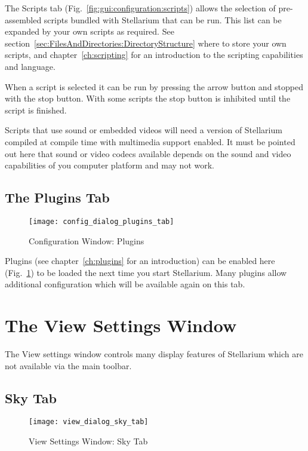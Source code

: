 The Scripts tab (Fig.~\ref{fig:gui:configuration:scripts}) allows the selection of
pre-assembled scripts bundled with Stellarium that can be run. This
list can be expanded by your own scripts as required. See
section~\ref{sec:FilesAndDirectories:DirectoryStructure} where to
store your own scripts, and chapter~\ref{ch:scripting} for an
introduction to the scripting capabilities and language.

When a script is selected it can be run by pressing the arrow button
and stopped with the stop button. With some scripts the stop button is
inhibited until the script is finished. %

Scripts that use sound or embedded videos will need a version of
Stellarium compiled at compile time with multimedia support
enabled. It must be pointed out here that sound or video codecs
available depends on the sound and video capabilities of you computer
platform and may not work.


\subsection{The Plugins Tab }
\label{sec:gui:configuration:plugins}


\begin{figure}[p]
\centering\texttt{[image: config\_dialog\_plugins\_tab]}
\caption{Configuration Window: Plugins}
\label{fig:gui:plugins}
\end{figure}

Plugins (see chapter~\ref{ch:plugins} for an introduction) can be
enabled here (Fig.~\ref{fig:gui:plugins}) to be loaded the next time
you start Stellarium.  Many plugins allow additional configuration
which will be available again on this tab.




\section{The View Settings Window}
\label{sec:gui:view}

The View settings window controls many display features of Stellarium
which are not available via the main toolbar.

\subsection{Sky Tab}
\label{sec:gui:view:sky}

\begin{figure}[t]
\centering\texttt{[image: view\_dialog\_sky\_tab]}
\caption{View Settings Window: Sky Tab}
\label{fig:gui:view:sky}
\end{figure}

